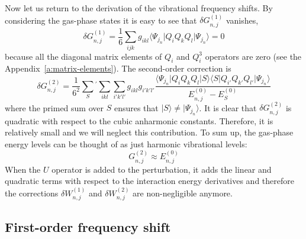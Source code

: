 \documentclass[a4paper,titlepage,twoside,fleqn,12pt]{book}
\begin{document}
\begin{refsection}
Now let us return to the derivation of the vibrational frequency shifts. 
By considering the gas-phase states it is easy to see that 
$\delta G_{n,j}^{(1)}$ vanishes,
%
\begin{equation}
\delta G_{n,j}^{(1)} = \frac{1}{6}\sum_{ijk} g_{ikl} 
\langle \Psi_{j_n} \vert Q_iQ_kQ_l \vert \Psi_{j_n} \rangle = 0
\end{equation}
%
because all the diagonal matrix elements of $Q_i$ and $Q_i^3$ operators
are zero (see the Appendix~\ref{a:matrix-elements}).
The second-order correction is 
%
\begin{equation}
\delta G_{n,j}^{(2)} = \frac{1}{6^2} \sum_{S}{^{'}} \sum_{ikl}\sum_{i'k'l'} g_{ikl} g_{i'k'l'}
\frac{\langle \Psi_{j_n} \vert Q_iQ_kQ_l \vert S \rangle \langle S \vert Q_{i'}Q_{k'}Q_{l'} \vert \Psi_{j_n} \rangle }
{ E_{n,j}^{(0)} - E_{S}^{(0)} }
\end{equation}
%
where the primed sum over $S$ ensures that $\vert S \rangle \ne \vert \Psi_{j_n} \rangle$. 
It is clear that $\delta G_{n,j}^{(2)}$ is quadratic with respect to the cubic anharmonic constants.
Therefore, it is relatively small and we will neglect this contribution.
To sum up, the gas-phase energy levels can be thought of as just 
harmonic vibrational levels:
%
\begin{equation}\label{e:ge}
G_{n,j}^{(2)} \approx E_{n,j}^{(0)}
\end{equation}
%
When the $U$ operator is added to the perturbation, it adds the linear
and quadratic terms with respect to the interaction energy derivatives and therefore
the corrections $\delta W_{n,j}^{(1)}$ and $\delta W_{n,j}^{(2)}$ 
are non-negligible anymore.

\subsection{First-order frequency shift}


\end{refsection}
\end{document}
